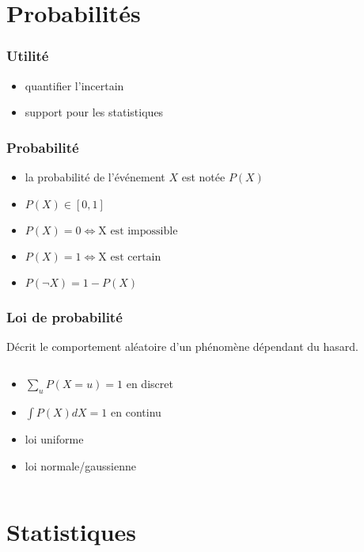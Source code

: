 \documentclass{formation}
\begin{document}
\section{Probabilités}

\begin{frame}
  \frametitle{Utilité}
  \begin{itemize}
  \item quantifier l'incertain
  \item support pour les statistiques
  \end{itemize}
\end{frame}

\begin{frame}
  \frametitle{Probabilité}

  \begin{itemize}
  \item la probabilité de l'événement $X$ est notée $P(X)$
  \item $P(X) \in [0, 1]$
  \item $P(X)=0 \iff \text{X est impossible}$
  \item $P(X)=1 \iff \text{X est certain}$
  \item $P(\neg X) = 1 - P(X)$
  
  \end{itemize}
\end{frame}

\begin{frame}
  \frametitle{Loi de probabilité}

  Décrit le comportement aléatoire d'un phénomène dépendant du hasard.
  \begin{columns}
    \begin{column}{.5\textwidth}
      \begin{itemize}
      \item $\sum_uP(X = u) = 1$ en discret
      \item $\int P(X)dX = 1$ en continu
      \item loi uniforme
      \item loi normale/gaussienne
      \end{itemize}
    \end{column}
    \begin{column}{.5\textwidth}
    \end{column}
  \end{columns}
\end{frame}

\section{Statistiques}
\end{document}

